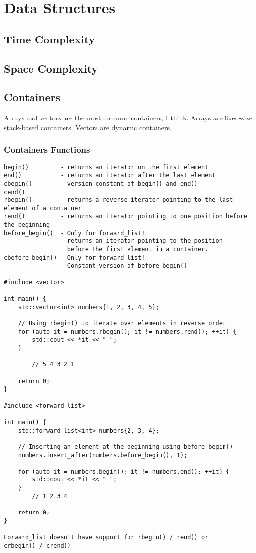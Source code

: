 \documentclass[openany]{report}
\begin{document}
\chapter{Data Structures}

\section{Time Complexity}

\section{Space Complexity}

\section{Containers}

Arrays and vectors are the most common containers, I think. Arrays are fixed-size stack-based containers. Vectors
are dynamic containers.

\subsection{Containers Functions}

\begin{verbatim}
begin()         - returns an iterator on the first element 
end()           - returns an iterator after the last element
cbegin()        - version constant of begin() and end()
cend()  
rbegin()        - returns a reverse iterator pointing to the last element of a container
rend()          - returns an iterator pointing to one position before the beginning
before_begin()  - Only for forward_list! 
                  returns an iterator pointing to the position
                  before the first element in a container.  
cbefore_begin() - Only for forward_list!
                  Constant version of before_begin()

#include <vector>

int main() {
    std::vector<int> numbers{1, 2, 3, 4, 5};

    // Using rbegin() to iterate over elements in reverse order
    for (auto it = numbers.rbegin(); it != numbers.rend(); ++it) {
        std::cout << *it << " ";
    }

        // 5 4 3 2 1

    return 0;
}

#include <forward_list>

int main() {
    std::forward_list<int> numbers{2, 3, 4};

    // Inserting an element at the beginning using before_begin()
    numbers.insert_after(numbers.before_begin(), 1);

    for (auto it = numbers.begin(); it != numbers.end(); ++it) {
        std::cout << *it << " ";
    }
        // 1 2 3 4

    return 0;
}

Forward_list doesn't have support for rbegin() / rend() or
crbegin() / crend()
\end{verbatim}
\end{document}
